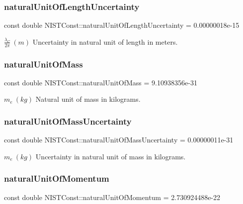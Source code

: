 \subsubsection{\texorpdfstring{natural\+Unit\+Of\+Length\+Uncertainty}{naturalUnitOfLengthUncertainty}}
{\footnotesize\ttfamily const double N\+I\+S\+T\+Const\+::natural\+Unit\+Of\+Length\+Uncertainty = 0.\+00000018e-\/15}

$\frac{\lambda_C}{2\pi} \ (m)$ Uncertainty in natural unit of length in meters. \mbox{\label{group___n_i_s_t_const-_natural_unit_ga0baa245921425da84c42fd881b7d1c0f}} 
\subsubsection{\texorpdfstring{natural\+Unit\+Of\+Mass}{naturalUnitOfMass}}
{\footnotesize\ttfamily const double N\+I\+S\+T\+Const\+::natural\+Unit\+Of\+Mass = 9.\+10938356e-\/31}

$m_e \ (kg)$ Natural unit of mass in kilograms. \mbox{\label{group___n_i_s_t_const-_natural_unit_gabf96b874ece35b6b5ada8207d80bab73}} 
\subsubsection{\texorpdfstring{natural\+Unit\+Of\+Mass\+Uncertainty}{naturalUnitOfMassUncertainty}}
{\footnotesize\ttfamily const double N\+I\+S\+T\+Const\+::natural\+Unit\+Of\+Mass\+Uncertainty = 0.\+00000011e-\/31}

$m_e \ (kg)$ Uncertainty in natural unit of mass in kilograms. \mbox{\label{group___n_i_s_t_const-_natural_unit_ga88a54043ec0c3a9de3d8549836044045}} 
\subsubsection{\texorpdfstring{natural\+Unit\+Of\+Momentum}{naturalUnitOfMomentum}}
{\footnotesize\ttfamily const double N\+I\+S\+T\+Const\+::natural\+Unit\+Of\+Momentum = 2.\+730924488e-\/22}

